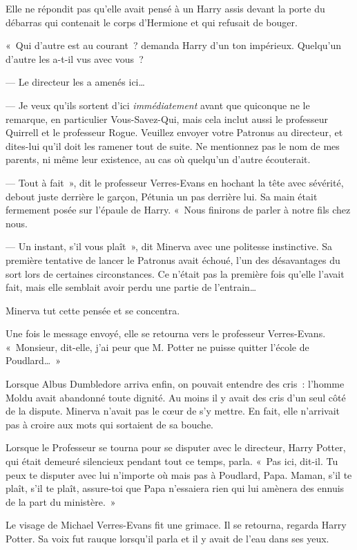 Elle ne répondit pas qu'elle avait pensé à un Harry assis devant la porte du débarras qui contenait le corps d'Hermione et qui refusait de bouger.

«~Qui d'autre est au courant~? demanda Harry d'un ton impérieux. Quelqu'un d'autre les a-t-il vus avec vous~?

--- Le directeur les a amenés ici…

--- Je veux qu'ils sortent d'ici \emph{immédiatement} avant que quiconque ne le remarque, en particulier Vous-Savez-Qui, mais cela inclut aussi le professeur Quirrell et le professeur Rogue. Veuillez envoyer votre Patronus au directeur, et dites-lui qu'il doit les ramener tout de suite. Ne mentionnez pas le nom de mes parents, ni même leur existence, au cas où quelqu'un d'autre écouterait.

--- Tout à fait~», dit le professeur Verres-Evans en hochant la tête avec sévérité, debout juste derrière le garçon, Pétunia un pas derrière lui. Sa main était fermement posée sur l'épaule de Harry. «~Nous finirons de parler à notre fils chez nous.

--- Un instant, s'il vous plaît~», dit Minerva avec une politesse instinctive. Sa première tentative de lancer le Patronus avait échoué, l'un des désavantages du sort lors de certaines circonstances. Ce n'était pas la première fois qu'elle l'avait fait, mais elle semblait avoir perdu une partie de l'entrain…

Minerva tut cette pensée et se concentra.

Une fois le message envoyé, elle se retourna vers le professeur Verres-Evans. «~Monsieur, dit-elle, j'ai peur que M. Potter ne puisse quitter l'école de Poudlard…~»

Lorsque Albus Dumbledore arriva enfin, on pouvait entendre des cris~: l'homme Moldu avait abandonné toute dignité. Au moins il y avait des cris d'un seul côté de la dispute. Minerva n'avait pas le cœur de s'y mettre. En fait, elle n'arrivait pas à croire aux mots qui sortaient de sa bouche.

Lorsque le Professeur se tourna pour se disputer avec le directeur, Harry Potter, qui était demeuré silencieux pendant tout ce temps, parla. «~Pas ici, dit-il. Tu peux te disputer avec lui n'importe où mais pas à Poudlard, Papa. Maman, s'il te plaît, s'il te plaît, assure-toi que Papa n'essaiera rien qui lui amènera des ennuis de la part du ministère.~»

Le visage de Michael Verres-Evans fit une grimace. Il se retourna, regarda Harry Potter. Sa voix fut rauque lorsqu'il parla et il y avait de l'eau dans ses yeux.

